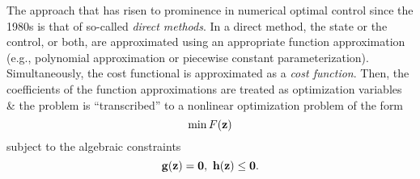 \documentclass{article}
\begin{document}
The approach that has risen to prominence in numerical optimal control since the 1980s is that of so-called {\it direct methods}. In a direct method, the state or the control, or both, are approximated using an appropriate function approximation (e.g., polynomial approximation or piecewise constant parameterization). Simultaneously, the cost functional is approximated as a {\it cost function}. Then, the coefficients of the function approximations are treated as optimization variables \& the problem is ``transcribed'' to a nonlinear optimization problem of the form
\begin{equation}
	\min F({\bf z})
\end{equation}
subject to the algebraic constraints
\begin{equation}
	{\bf g}({\bf z}) = {\bf 0},\ {\bf h}({\bf z})\le{\bf 0}.
\end{equation}
\end{document}

